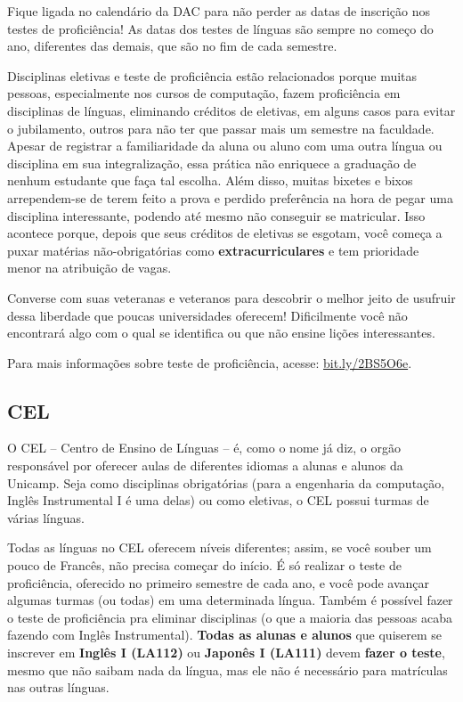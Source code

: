 Fique ligada no calendário da DAC para não perder as datas de inscrição nos
testes de proficiência! As datas dos testes de línguas são sempre no começo do
ano, diferentes das demais, que são no fim de cada semestre.

Disciplinas eletivas e teste de proficiência estão relacionados porque muitas
pessoas, especialmente nos cursos de computação, fazem proficiência em
disciplinas de línguas, eliminando créditos de eletivas, em alguns casos para
evitar o jubilamento, outros para não ter que passar mais um semestre na
faculdade. Apesar de registrar a familiaridade da aluna ou aluno com uma outra
língua ou disciplina em sua integralização, essa prática não enriquece a
graduação de nenhum estudante que faça tal escolha. Além disso, muitas bixetes
e bixos arrependem-se de terem feito a prova e perdido preferência na hora de
pegar uma disciplina interessante, podendo até mesmo não conseguir se
matricular. Isso acontece porque, depois que seus créditos de eletivas se
esgotam, você começa a puxar matérias não-obrigatórias como
\textbf{extracurriculares} e tem prioridade menor na atribuição de vagas.

Converse com suas veteranas e veteranos para descobrir o melhor jeito de
usufruir dessa liberdade que poucas universidades oferecem! Dificilmente você
não encontrará algo com o qual se identifica ou que não ensine lições
interessantes.

Para mais informações sobre teste de proficiência, acesse:
\url{bit.ly/2BS5O6e}.

\subsection{CEL}

O CEL -- Centro de Ensino de Línguas -- é, como o nome já diz, o orgão
responsável por oferecer aulas de diferentes idiomas a alunas e alunos da
Unicamp. Seja como disciplinas obrigatórias (para a engenharia da computação,
Inglês Instrumental I é uma delas) ou como eletivas, o CEL possui turmas de
várias línguas.

Todas as línguas no CEL oferecem níveis diferentes; assim, se você souber um
pouco de Francês, não precisa começar do início. É só realizar o teste de
proficiência, oferecido no primeiro semestre de cada ano, e você pode avançar
algumas turmas (ou todas) em uma determinada língua. Também é possível fazer o
teste de proficiência pra eliminar disciplinas (o que a maioria das pessoas
acaba fazendo com Inglês Instrumental). \textbf{Todas as alunas e alunos} que
quiserem se inscrever em \textbf{Inglês I (LA112)} ou
\textbf{Japonês I (LA111)} devem \textbf{fazer o teste}, mesmo que não saibam
nada da língua, mas ele não é necessário para matrículas nas outras línguas.

